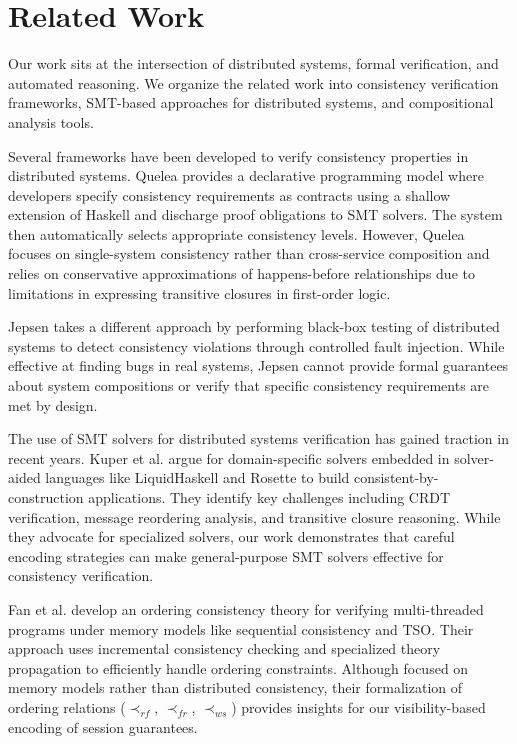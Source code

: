 \section{Related Work}

Our work sits at the intersection of distributed systems, formal
verification, and automated reasoning.
We organize the related work into consistency verification
frameworks, SMT-based approaches
for distributed systems, and compositional analysis tools.

Several frameworks have been developed to verify consistency
properties in distributed systems.
Quelea \cite{sivaramakrishnan2015declarative} provides a declarative
programming model where developers
specify consistency requirements as contracts using a shallow
extension of Haskell and discharge proof obligations to SMT solvers.
The system then automatically selects appropriate consistency levels.
However, Quelea focuses on single-system consistency rather than
cross-service composition and relies on conservative
approximations of happens-before relationships due to limitations in
expressing transitive closures in first-order logic.

Jepsen \cite{kingsbury2025jepsen} takes a different approach by
performing black-box testing of
distributed systems to detect consistency violations through
controlled fault injection. While
effective at finding bugs in real systems, Jepsen cannot provide
formal guarantees about system
compositions or verify that specific consistency requirements are met by design.

The use of SMT solvers for distributed systems verification has
gained traction in recent years.
Kuper et al. \cite{kuper2019toward} argue for domain-specific solvers
embedded in solver-aided
languages like LiquidHaskell and Rosette to build
consistent-by-construction applications.
They identify key challenges including CRDT verification, message
reordering analysis, and transitive
closure reasoning. While they advocate for specialized solvers, our
work demonstrates that careful encoding
strategies can make general-purpose SMT solvers effective for
consistency verification.

Fan et al. \cite{fan2023satisfiability} develop an ordering
consistency theory for verifying
multi-threaded programs under memory models like sequential
consistency and TSO. Their approach
uses incremental consistency checking and specialized theory
propagation to efficiently handle
ordering constraints. Although focused on memory models rather than
distributed consistency,
their formalization of ordering relations ($\prec_{rf}$,
$\prec_{fr}$, $\prec_{ws}$) provides insights
for our visibility-based encoding of session guarantees.

